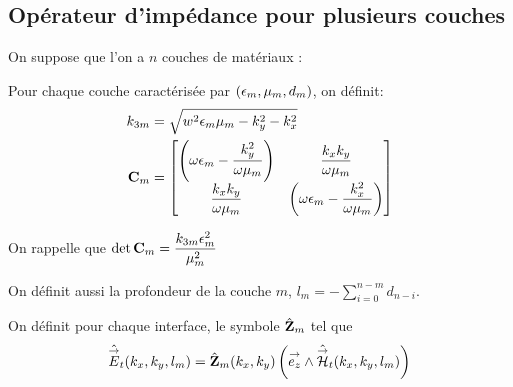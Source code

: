 
    \subsection{Opérateur d'impédance pour plusieurs couches}
        On suppose que l'on a \(n\) couches de matériaux :

        \begin{figure}[h!btp]
            \centering
            \begin{tikzpicture}
                
            \end{tikzpicture}
        \end{figure}

        Pour chaque couche caractérisée par \((\eps_m,\mu_m,d_m)\), on définit:
        \begin{align}
        k_{3m} &= \sqrt{w^2\eps_m\mu_m - k_y^2 - k_x^2}
        \\
        \mC_m &=
            \begin{bmatrix}
                \left(\w\eps_m-\frac{k_y^2}{\w\mu_m}\right) & \frac{k_xk_y}{\w\mu_m}\\
                \frac{k_xk_y}{\w\mu_m} & \left(\w\eps_m-\frac{k_x^2}{\w\mu_m}\right)
            \end{bmatrix}
        \end{align}

        On rappelle que \(\det{\mC_m} = \frac{k_{3m}\eps_m^2}{\mu_m^2}\)

        On définit aussi la profondeur de la couche \(m\), \(l_m = -\sum_{i=0}^{n-m} d_{n-i} \).

        \begin{defn}
            On définit pour chaque interface, le symbole \(\hat \mZ_m\) tel que
            \begin{equation}
                \hat \vE_t(k_x,k_y,l_m) = \hat \mZ_m(k_x,k_y) \left(\vect{e_z} \pvect \hat \vH_t(k_x,k_y,l_m)\right)
            \end{equation}
        \end{defn}

